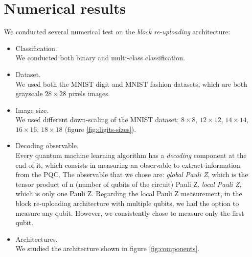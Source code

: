 \section{Numerical results}

We conducted several numerical test on the \textit{block re-uploading} architecture:

\begin{itemize}
    \item Classification.\\
    We conducted both binary and multi-class classification.
    \item Dataset.\\
    We used both the MNIST digit and MNIST fashion datasets, which are both grayscale $28\times28$ pixels images.
    \item Image size.\\
    We used different down-scaling of the MNIST dataset: $8\times8$, $12\times12$, $14\times14$, 
    $16\times16$, $18\times18$ (figure \ref{fig:digits-sizes}).
    \item Decoding observable.\\
    Every quantum machine learning algorithm has a \textit{decoding} component at the end of it, which consists in 
    measuring an observable to extract information from the PQC.
    The observable that we chose are: \textit{global Pauli Z}, which is the tensor product of n (number of qubits
    of the circuit) Pauli Z, \textit{local Pauli Z}, which is only one Pauli Z.
    Regarding the local Pauli Z measurement, in the block re-uploading architecture with multiple qubits, 
    we had the option to measure any qubit. However, we consistently chose to measure only the first qubit.
    \item Architectures.\\
    We studied the architecture shown in figure \ref{fig:components}.
\end{itemize}


